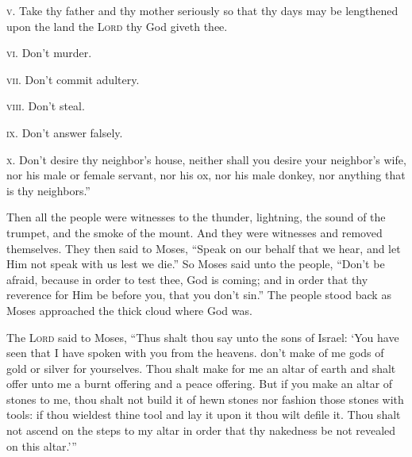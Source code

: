 \begin{inparaenum}
   \textsc{v.} Take thy father and thy mother seriously so that thy days may be lengthened upon the land the \textsc{Lord} thy God giveth thee.%
  
   \textsc{vi.} Don't murder.%
  
   \textsc{vii.} Don't commit adultery.%
  
   \textsc{viii.} Don't steal.%
  
   \textsc{ix.} Don't answer falsely.%
  
   \textsc{x.} Don't desire thy neighbor's house, neither shall you desire your neighbor's wife, nor his male or female servant, nor his ox, nor his male donkey, nor anything that is thy neighbors.''%
  
   Then all the people were witnesses to the thunder, lightning, the sound of the trumpet, and the smoke of the mount. And they were witnesses and removed themselves.%
   They then said to Moses, ``Speak on our behalf that we hear, and let Him not speak with us lest we die.''%
   So Moses said unto the people, ``Don't be afraid, because in order to test thee, God is coming; and in order that thy reverence for Him be before you, that you don't sin.''%
   The people stood back as Moses approached the thick cloud where God was.%
  
   The \textsc{Lord} said to Moses, ``Thus shalt thou say unto the sons of Israel: `You have seen that I have spoken with you from the heavens.%
   don't make of me gods of gold or silver for yourselves.%
   Thou shalt make for me an altar of earth and shalt offer unto me a burnt offering and a peace offering.%
   But if you make an altar of stones to me, thou shalt not build it of hewn stones nor fashion those stones with tools: if thou wieldest thine tool and lay it upon it thou wilt defile it.%
   Thou shalt not ascend on the steps to my altar in order that thy nakedness be not revealed on this altar.'\thinspace''%
\end{inparaenum}
